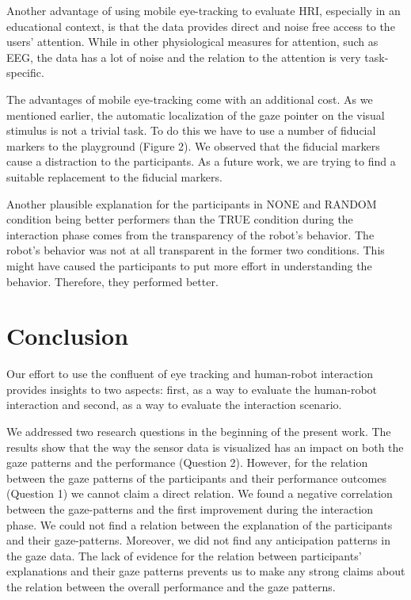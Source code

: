 \documentclass{sig-alternate}
\begin{document}
Another advantage of using mobile eye-tracking to evaluate HRI,
especially in an educational context, is that the data provides direct
and noise free access to the users' attention. While in other
physiological measures for attention, such as EEG, the data has a lot of
noise and the relation to the attention is very task-specific.

The advantages of mobile eye-tracking come with an additional cost. As
we mentioned earlier, the automatic localization of the gaze pointer on
the visual stimulus is not a trivial task. To do this we have to use a
number of fiducial markers to the playground (Figure 2). We observed
that the fiducial markers cause a distraction to the participants. As a
future work, we are trying to find a suitable replacement to the
fiducial markers.

Another plausible explanation for the participants in NONE and RANDOM condition
being better performers than the TRUE condition during the interaction phase
comes from the transparency of the robot's behavior. The robot's
behavior was not at all transparent in the former two conditions. This might
have caused the participants to put more effort in understanding the behavior.
Therefore, they performed better.


\section{Conclusion}

Our effort to use the confluent of eye tracking and human-robot
interaction provides insights to two aspects: first, as a way to
evaluate the human-robot interaction and second, as a way to evaluate
the interaction scenario.

We addressed two research questions in the beginning of the present
work. The results show that the way the sensor data is visualized has an
impact on both the gaze patterns and the performance (Question 2).
However, for the relation between the gaze patterns of the participants
and their performance outcomes (Question 1) we cannot claim a direct
relation. We found a negative correlation between the gaze-patterns and
the first improvement during the interaction phase. We could not find a
relation between the explanation of the participants and their
gaze-patterns. Moreover, we did not find any anticipation patterns in
the gaze data. The lack of evidence for the relation between
participants' explanations and their gaze patterns prevents us to make
any strong claims about the relation between the overall performance and
the gaze patterns.
\end{document}
